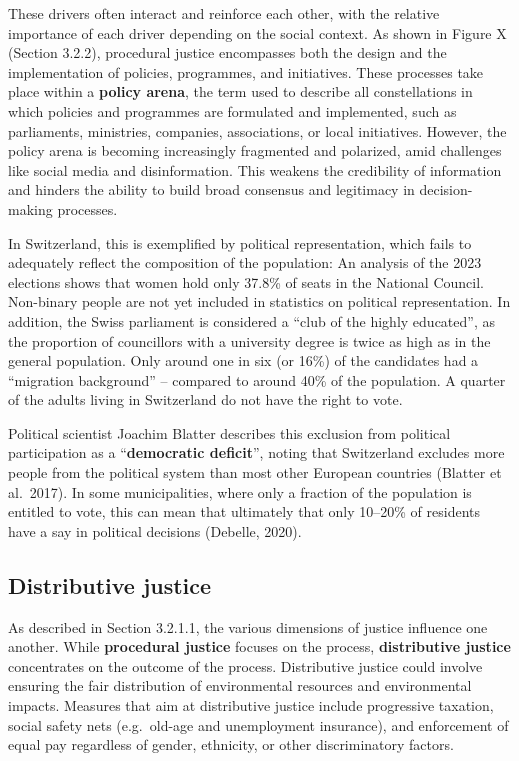 \documentclass[
  a4paper,
  openany]{book}
\begin{document}
These drivers often interact and reinforce each other, with the relative
importance of each driver depending on the social context. As shown in
Figure X (Section 3.2.2), procedural justice encompasses both the design
and the implementation of policies, programmes, and initiatives. These
processes take place within a \textbf{policy arena}, the term used to
describe all constellations in which policies and programmes are
formulated and implemented, such as parliaments, ministries, companies,
associations, or local initiatives. However, the policy arena is
becoming increasingly fragmented and polarized, amid challenges like
social media and disinformation. This weakens the credibility of
information and hinders the ability to build broad consensus and
legitimacy in decision-making processes.

In Switzerland, this is exemplified by political representation, which
fails to adequately reflect the composition of the population: An
analysis of the 2023 elections shows that women hold only 37.8\% of
seats in the National Council. Non-binary people are not yet included in
statistics on political representation. In addition, the Swiss
parliament is considered a ``club of the highly educated'', as the
proportion of councillors with a university degree is twice as high as
in the general population. Only around one in six (or 16\%) of the
candidates had a ``migration background'' -- compared to around 40\% of
the population. A quarter of the adults living in Switzerland do not
have the right to vote.

Political scientist Joachim Blatter describes this exclusion from
political participation as a ``\textbf{democratic deficit}'', noting
that Switzerland excludes more people from the political system than
most other European countries (Blatter et al.~2017). In some
municipalities, where only a fraction of the population is entitled to
vote, this can mean that ultimately that only 10--20\% of residents have
a say in political decisions (Debelle, 2020).

\subsection{Distributive justice}\label{distributive-justice}

As described in Section 3.2.1.1, the various dimensions of justice
influence one another. While \textbf{procedural justice} focuses on the
process, \textbf{distributive justice} concentrates on the outcome of
the process. Distributive justice could involve ensuring the fair
distribution of environmental resources and environmental impacts.
Measures that aim at distributive justice include progressive taxation,
social safety nets (e.g.~old-age and unemployment insurance), and
enforcement of equal pay regardless of gender, ethnicity, or other
discriminatory factors.
\end{document}
